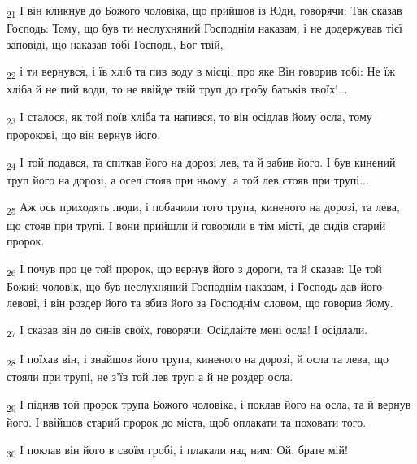 \begin{tcolorbox}
\textsubscript{21} І він кликнув до Божого чоловіка, що прийшов із Юди, говорячи: Так сказав Господь: Тому, що був ти неслухняний Господнім наказам, і не додержував тієї заповіді, що наказав тобі Господь, Бог твій,
\end{tcolorbox}
\begin{tcolorbox}
\textsubscript{22} і ти вернувся, і їв хліб та пив воду в місці, про яке Він говорив тобі: Не їж хліба й не пий води, то не ввійде твій труп до гробу батьків твоїх!...
\end{tcolorbox}
\begin{tcolorbox}
\textsubscript{23} І сталося, як той поїв хліба та напився, то він осідлав йому осла, тому пророкові, що він вернув його.
\end{tcolorbox}
\begin{tcolorbox}
\textsubscript{24} І той подався, та спіткав його на дорозі лев, та й забив його. І був кинений труп його на дорозі, а осел стояв при ньому, а той лев стояв при трупі...
\end{tcolorbox}
\begin{tcolorbox}
\textsubscript{25} Аж ось приходять люди, і побачили того трупа, киненого на дорозі, та лева, що стояв при трупі. І вони прийшли й говорили в тім місті, де сидів старий пророк.
\end{tcolorbox}
\begin{tcolorbox}
\textsubscript{26} І почув про це той пророк, що вернув його з дороги, та й сказав: Це той Божий чоловік, що був неслухняний Господнім наказам, і Господь дав його левові, і він роздер його та вбив його за Господнім словом, що говорив йому.
\end{tcolorbox}
\begin{tcolorbox}
\textsubscript{27} І сказав він до синів своїх, говорячи: Осідлайте мені осла! І осідлали.
\end{tcolorbox}
\begin{tcolorbox}
\textsubscript{28} І поїхав він, і знайшов його трупа, киненого на дорозі, й осла та лева, що стояли при трупі, не з'їв той лев труп а й не роздер осла.
\end{tcolorbox}
\begin{tcolorbox}
\textsubscript{29} І підняв той пророк трупа Божого чоловіка, і поклав його на осла, та й вернув його. І ввійшов старий пророк до міста, щоб оплакати та поховати того.
\end{tcolorbox}
\begin{tcolorbox}
\textsubscript{30} І поклав він його в своїм гробі, і плакали над ним: Ой, брате мій!
\end{tcolorbox}
